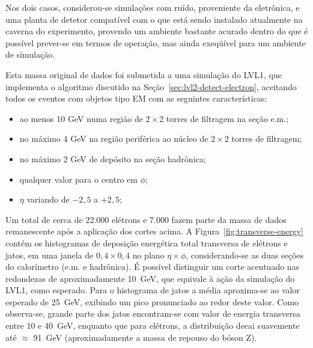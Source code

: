Nos dois casos, considerou-se simulações com ruído, proveniente da eletrônica,
e uma planta de detetor compatível com o que está sendo instalado atualmente
na caverna do experimento, provendo um ambiente bastante acurado dentro do que
é possível prever-se em termos de operação, mas ainda exeqüível para um
ambiente de simulação.

Esta massa original de dados foi submetida a uma simulação do LVL1, que
implementa o algoritmo discutido na Seção~\ref{sec:lvl2-detect-electron},
aceitando todos os eventos com objetos tipo EM com as seguintes
características:

\begin{itemize}
\item ao menos 10 GeV numa região de $2\times2$ torres de filtragem na seção
e.m.;
\item no máximo 4 GeV na região periférica ao núcleo de $2\times2$ torres de
filtragem; 
\item no máximo 2 GeV de depósito na seção hadrônica;
\item qualquer valor para o centro em $\phi$;
\item $\eta$ variando de $-2,5$ a $+2,5$;
\end{itemize}

Um total de cerca de 22.000 elétrons e 7.000 fazem parte da massa de dados
remanescente após a aplicação dos cortes acima. A
Figura~\ref{fig:transverse-energy} contém os histogramas de deposição
energética total transversa de elétrons e jatos, em uma janela de $0,4 \times
0,4$ no plano $\eta\times\phi$, considerando-se as duas seções do calorímetro
(e.m. e hadrônica). É possível distinguir um corte acentuado nas redondezas de
aproximadamente 10~GeV, que equivale à ação da simulação do LVL1, como
esperado. Para o histograma de jatos a média aproxima-se ao valor esperado de
25~GeV, exibindo um pico pronunciado ao redor deste valor. Como observa-se,
grande parte dos jatos encontram-se com valor de energia transversa entre 10 e
40~GeV, enquanto que para elétrons, a distribuição decai suavemente até
$\approx$ 91~GeV (aproximadamente a massa de repouso do bóson Z).


